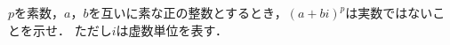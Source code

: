 \documentclass[../../main.tex]{subfiles}
\begin{document}
$p$を素数，$a$，$b$を互いに素な正の整数とするとき，${(a+bi)}^p$は実数ではないことを示せ．
ただし$i$は虚数単位を表す．
\end{document}
